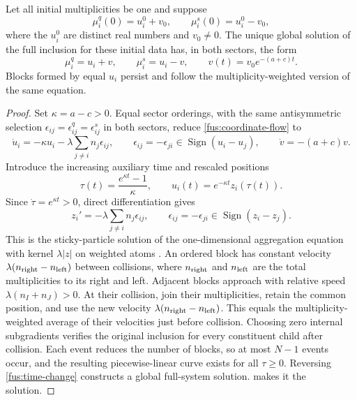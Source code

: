 Let all initial multiplicities be one and suppose
\begin{equation}
 \mu_i^q(0)=u_i^0+v_0,\qquad
 \mu_i^s(0)=u_i^0-v_0,
 \label{fus:admitted-class}
\end{equation}
where the $u_i^0$ are distinct real numbers and $v_0\ne0$. The unique
global solution of the full inclusion for these initial data has, in both
sectors, the form
\begin{equation}
 \mu_i^q=u_i+v,\qquad \mu_i^s=u_i-v,\qquad
 v(t)=v_0e^{-(a+c)t}.
 \label{fus:invariant-form}
\end{equation}
Blocks formed by equal $u_i$ persist and follow the multiplicity-weighted
version of the same equation.
\begin{proof}
Set $\kappa=a-c>0$. Equal sector orderings, with the same antisymmetric
selection $\epsilon_{ij}=\epsilon_{ij}^q=\epsilon_{ij}^s$ in both sectors,
reduce \cref{fus:coordinate-flow} to
\begin{equation}
 \dot u_i=-\kappa u_i-\lambda\sum_{j\ne i}n_j\epsilon_{ij},\qquad
 \epsilon_{ij}=-\epsilon_{ji}\in\operatorname{Sign}(u_i-u_j),\qquad
 \dot v=-(a+c)v.
\end{equation}
Introduce the increasing auxiliary time and rescaled positions
\begin{equation}
 \tau(t)=\frac{e^{\kappa t}-1}{\kappa},\qquad
 u_i(t)=e^{-\kappa t}z_i(\tau(t)).
 \label{fus:time-change}
\end{equation}
Since $\dot\tau=e^{\kappa t}>0$, direct differentiation gives
\begin{equation}
 z_i'=-\lambda\sum_{j\ne i}n_j\epsilon_{ij},\qquad
 \epsilon_{ij}=-\epsilon_{ji}\in\operatorname{Sign}(z_i-z_j).
 \label{fus:sticky-flow}
\end{equation}
This is the sticky-particle solution of the one-dimensional aggregation
equation with kernel $\lambda|z|$ on weighted atoms
\cite{CarrilloEtAl2011,BonaschiEtAl2015}. An ordered block has constant
velocity $\lambda(n_{\rm right}-n_{\rm left})$ between collisions, where
$n_{\rm right}$ and $n_{\rm left}$ are the total multiplicities to its
right and left. Adjacent blocks approach with relative speed
$\lambda(n_I+n_J)>0$. At their collision, join their multiplicities, retain
the common position, and use the new velocity
$\lambda(n_{\rm right}-n_{\rm left})$. This equals the multiplicity-weighted
average of their velocities just before collision. Choosing zero internal
subgradients verifies the original inclusion for every constituent child
after collision. Each event reduces the number of blocks, so at most
$N-1$ events occur, and the resulting piecewise-linear curve exists for
all $\tau\geq0$. Reversing \cref{fus:time-change} constructs a global
full-system solution.  makes it the solution.
\end{proof}

